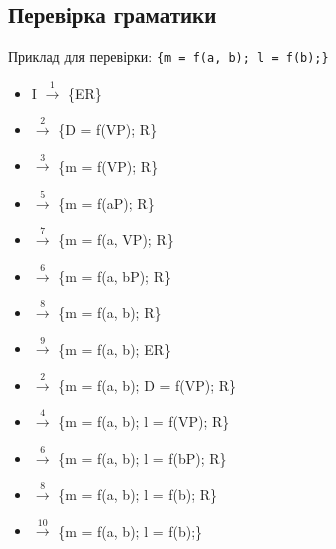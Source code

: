 \subsection{Перевірка граматики}
Приклад для перевірки: \verb|{m = f(a, b); l = f(b);}|
\begin{itemize}
    \item[]  I $\xrightarrow{1}$ \{ER\}
    \item[]  $\xrightarrow{2}$ \{D = f(VP); R\}
    \item[]  $\xrightarrow{3}$ \{m = f(VP); R\}
    \item[]  $\xrightarrow{5}$ \{m = f(aP); R\}
    \item[]  $\xrightarrow{7}$ \{m = f(a, VP); R\}
    \item[]  $\xrightarrow{6}$ \{m = f(a, bP); R\}
    \item[]  $\xrightarrow{8}$ \{m = f(a, b); R\}
    \item[]  $\xrightarrow{9}$ \{m = f(a, b); ER\}
    \item[]  $\xrightarrow{2}$ \{m = f(a, b); D = f(VP); R\}
    \item[]  $\xrightarrow{4}$ \{m = f(a, b); l = f(VP); R\}
    \item[]  $\xrightarrow{6}$ \{m = f(a, b); l = f(bP); R\}
    \item[]  $\xrightarrow{8}$ \{m = f(a, b); l = f(b); R\}
    \item[]  $\xrightarrow{10}$ \{m = f(a, b); l = f(b);\}
\end{itemize}

